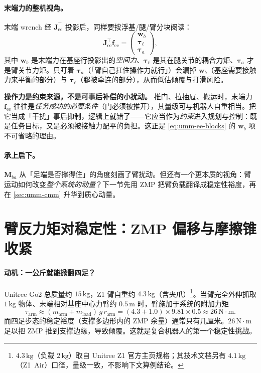 \paragraph{末端力的整机视角。}
末端 wrench 经 $\mathbf J_{\text{ee}}^\top$ 投影后，同样要按浮基/腿/臂分块阅读：
\begin{equation}
  \mathbf J_{\text{ee}}^\top\mathbf f_{\text{ee}}=\begin{pmatrix}\mathbf w_b\\ \boldsymbol\tau_\ell\\ \boldsymbol\tau_a\end{pmatrix},
  \label{eq:umm-ee-blocks}
\end{equation}
其中 $\mathbf w_b$ 是末端力在基座行投影出的\emph{空间力}、$\boldsymbol\tau_\ell$ 是其在腿关节的耦合力矩、$\boldsymbol\tau_a$ 才是臂关节力矩。只盯着 $\boldsymbol\tau_a$（「臂自己扛住操作力就行」）会漏掉 $\mathbf w_b$（基座需要接触力来平衡的部分）与 $\boldsymbol\tau_\ell$（腿被牵连的部分），从而低估倾覆与打滑风险。

\begin{insight}
\textbf{操作力是约束来源，不是可事后补偿的小扰动。}\;
推门、拉抽屉、搬运时，末端力 $\mathbf f_{\text{ee}}$ 往往是\emph{任务成功的必要条件}（门必须被推开），其量级可与机器人自重相当。把它当成「干扰」事后抑制，逻辑上就错了——它应当作为\emph{约束}进入规划与控制：既是任务目标，又是必须被接触力配平的负担。这正是 \cref{eq:umm-ee-blocks} 的 $\mathbf w_b$ 项不可省略的理由。
\end{insight}

\paragraph{承上启下。}
$\mathbf M_{ba}$ 从「足端是否撑得住」的角度刻画了臂扰动。但还有一个更本质的视角：臂运动如何改变\emph{整个系统的动量}？下一节先用 ZMP 把臂负载翻译成稳定性裕度，再在 \cref{sec:umm-cmm} 升华到质心动量。

\section{臂反力矩对稳定性：ZMP 偏移与摩擦锥收紧}
\label{sec:umm-zmp}

\paragraph{动机：一公斤就能掀翻四足？}
Unitree Go2 总质量约 $15\,\mathrm{kg}$，Z1 臂自重约 $4.3\,\mathrm{kg}$（含夹爪）\footnote{$4.3\,\mathrm{kg}$（负载 $2\,\mathrm{kg}$）取自 Unitree Z1 官方主页规格；其技术文档另有 $4.1\,\mathrm{kg}$（Z1~Air）口径，量级一致，不影响下文算例结论。}。当臂完全外伸抓取 $1\,\mathrm{kg}$ 物体、末端相对基座中心力臂约 $0.5\,\mathrm{m}$ 时，臂施加于系统的附加力矩
\begin{equation}
  \tau_{\text{arm}}\approx(m_{\text{arm}}+m_{\text{load}})\,g\,r_{\text{arm}}
  =(4.3+1.0)\times9.81\times0.5\approx26\,\mathrm{N\!\cdot\!m}.
  \label{eq:umm-tau-arm}
\end{equation}
而四足步态的稳定裕度（支撑多边形内的 ZMP 余量）通常只有几厘米。$26\,\mathrm{N\!\cdot\!m}$ 足以把 ZMP 推到支撑边缘，导致倾覆。这就是复合机器人的第一个稳定性挑战。

